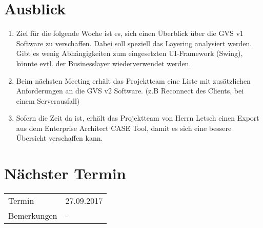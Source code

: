 \documentclass[11pt, a4paper,oneside]{scrartcl}
\begin{document}
\section{Ausblick}
\begin{enumerate}
	\item Ziel für die folgende Woche ist es, sich einen Überblick über die GVS v1 Software zu verschaffen. Dabei soll speziell das Layering analysiert werden. Gibt es wenig Abhängigkeiten zum eingesetzten UI-Framework (Swing), könnte evtl. der Businesslayer wiederverwendet werden.
	\item Beim nächsten Meeting erhält das Projektteam eine Liste mit zusätzlichen Anforderungen an die GVS v2 Software. (z.B Reconnect des Clients, bei einem Serverausfall)
	\item Sofern die Zeit da ist, erhält das Projektteam von Herrn Letsch einen Export aus dem Enterprise Architect CASE Tool, damit es sich eine bessere Übersicht verschaffen kann.
\end{enumerate}

\section{Nächster Termin}
\begin{tabu} to \linewidth {l X }
	\toprule
	Termin & 27.09.2017 \\
	Bemerkungen & - \\
	\bottomrule
\end{tabu}
\end{document}
